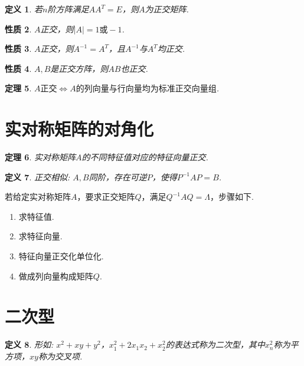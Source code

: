 \documentclass[12pt, a4paper, oneside]{ctexbook}
\newtheorem{theorem}{定理}[section]
\newtheorem{definition}[theorem]{定义}
\newtheorem{quolity}[theorem]{性质}
\begin{document}
\begin{definition}
    若$n$阶方阵满足$AA^T = E$，则$A$为正交矩阵. 
\end{definition}

\begin{quolity}
    $A$正交，则$|A|=1 \mbox{或} -1$. 
\end{quolity}

\begin{quolity}
    $A$正交，则$A^{-1} = A^T$，且$A^{-1}$与$A^T$均正交. 
\end{quolity}

\begin{quolity}
    $A,B$是正交方阵，则$AB$也正交. 
\end{quolity}

\begin{theorem}
    $A\mbox{正交} \Leftrightarrow A\mbox{的列向量与行向量均为标准正交向量组}$. 
\end{theorem}

\section{实对称矩阵的对角化}

\begin{theorem}
    实对称矩阵$A$的不同特征值对应的特征向量正交. 
\end{theorem}

\begin{definition}
    正交相似: $A,B$同阶，存在可逆$P$，使得$P^{-1}AP = B$. 
\end{definition}

若给定实对称矩阵$A$，要求正交矩阵$Q$，满足$Q^{-1}AQ=\Lambda$，步骤如下. 

\begin{enumerate}
    \item 求特征值. 
    \item 求特征向量. 
    \item 特征向量正交化单位化. 
    \item 做成列向量构成矩阵$Q$. 
\end{enumerate}

\section{二次型}

\begin{definition}
    形如: $x^2 + xy + y^2$，$x_1^2 + 2x_1x_2 + x_2^2$的表达式称为二次型，其中$x_n^2$称为平方项，$xy$称为交叉项. 
\end{definition}
\end{document}
